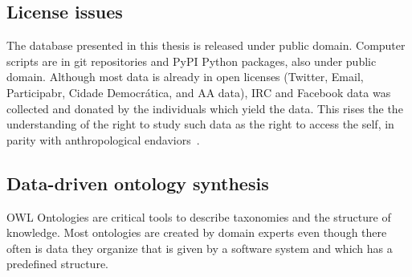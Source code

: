 \begin{enumerate}[leftmargin=0cm]
	\end{enumerate}

	\subsection{License issues}
	The database presented in this thesis is released under public domain.
	Computer scripts are in git repositories and PyPI Python packages, also under public domain.
	Although most data is already in open licenses (Twitter, Email, Participabr, Cidade Democrática, and AA data), IRC and Facebook data was collected
	and donated by the individuals which yield the data.
	This rises the the understanding of the right to study such data as the right to access the self,
	in parity with anthropological endaviors~\cite{antphy,antphy2}.


\subsection{Data-driven ontology synthesis}
OWL Ontologies are critical tools to describe taxonomies and the
structure of knowledge.
Most ontologies are created by domain experts even though there often is data they
organize that is given by a software system and which has a predefined
structure.  

